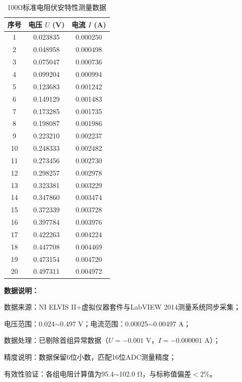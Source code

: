 \documentclass[11pt]{article}
\begin{document}
\begin{table}[H]
  \centering
  \caption{100Ω标准电阻伏安特性测量数据}
  \label{tab:100ohm_voltamp_valid}
  \begin{threeparttable}
    \begin{tabular}{ccc}
      \toprule
      序号 & 电压 $U$ (V) & 电流 $I$ (A) \\
      \midrule
      1  & 0.023835  & 0.000250  \\
      2  & 0.048958  & 0.000498  \\
      3  & 0.075047  & 0.000736  \\
      4  & 0.099204  & 0.000994  \\
      5  & 0.123683  & 0.001242  \\
      6  & 0.149129  & 0.001483  \\
      7  & 0.173285  & 0.001735  \\
      8  & 0.198087  & 0.001986  \\
      9  & 0.223210  & 0.002237  \\
      10 & 0.248333  & 0.002482  \\
      11 & 0.273456  & 0.002730  \\
      12 & 0.298257  & 0.002978  \\
      13 & 0.323381  & 0.003229  \\
      14 & 0.347860  & 0.003474  \\
      15 & 0.372339  & 0.003728  \\
      16 & 0.397784  & 0.003976  \\
      17 & 0.422263  & 0.004224  \\
      18 & 0.447708  & 0.004469  \\
      19 & 0.473154  & 0.004720  \\
      20 & 0.497311  & 0.004972  \\
      \bottomrule
    \end{tabular}
    \begin{tablenotes}
      \item \textbf{数据说明：}
      \item[1] 数据来源：NI ELVIS II+虚拟仪器套件与LabVIEW 2014测量系统同步采集；
      \item[2] 电压范围：0.024$\sim$0.497 V；电流范围：0.00025$\sim$0.00497 A；
      \item[3] 数据处理：已剔除首组异常数据（$U = -0.001$ V，$I = -0.000001$ A）；
      
      \item[4] 精度说明：数据保留6位小数，匹配16位ADC测量精度；
      
      \item[5] 有效性验证：各组电阻计算值为95.4$\sim$102.0 Ω，与标称值偏差$<$2\%。
    \end{tablenotes}
  \end{threeparttable}
\end{table}
\end{document}
